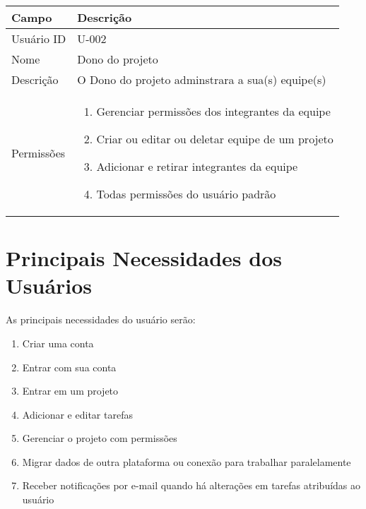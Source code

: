 \noindent
\begin{tabularx}{\textwidth}{| l | X |}
\hline
Campo             & Descrição                                                                                                                                                                           \\ \hline
Usuário ID    & U-002                                                                                                                                                                              \\ \hline
Nome              & Dono do projeto                                                                                                                                                                       \\ \hline
Descrição         & O Dono do projeto adminstrara a sua(s) equipe(s) 
\\ \hline
Permissões &
\begin{enumerate}
    \item Gerenciar permissões dos integrantes da equipe
    \item Criar ou editar ou deletar equipe de um projeto 
    \item Adicionar e retirar integrantes da equipe
    \item Todas permissões do usuário padrão
\end{enumerate}
\\ \hline

\end{tabularx}

\vspace{1cm}

\section{Principais Necessidades dos Usuários}

As principais necessidades do usuário serão:
\begin{enumerate}[leftmargin=2.5\parindent]
    \item Criar uma conta
    \item Entrar com sua conta 
    \item Entrar em um projeto
    \item Adicionar e editar tarefas
    \item Gerenciar o projeto com permissões
    \item Migrar dados de outra plataforma ou conexão para trabalhar paralelamente
    \item Receber notificações por e-mail quando há alterações em  tarefas atribuídas ao usuário
\end{enumerate}